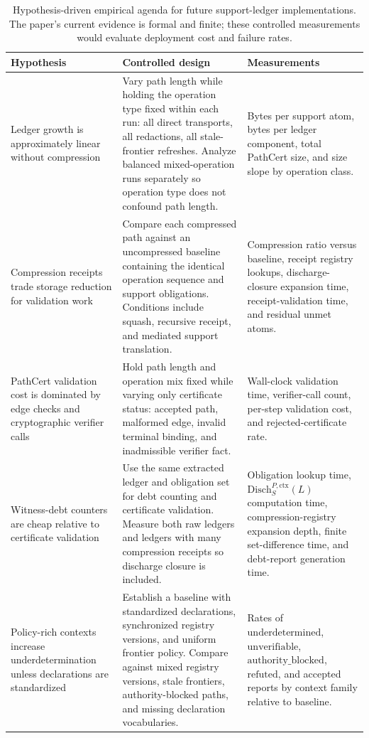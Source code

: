 \documentclass[11pt,twoside]{article}
\newcommand{\OGSchemaTableFont}{\footnotesize}
\newcommand{\OGTableHeaderRow}{\rowcolor{tableheaderbg}}
\newcommand{\TableHeaderRow}{\OGTableHeaderRow}
\newcommand{\OGAltRow}{\rowcolor{tablerowbg}}
\newenvironment{OGTable}[2][ht]{%
  \begin{table}[#1]
  \centering
  #2
  \renewcommand{\arraystretch}{1.08}%
  \rowcolors{2}{tablerowbg}{white}%
}{%
  \rowcolors{2}{}{}%
  \end{table}%
}
\theoremstyle{definition}
\newcommand{\Disch}{\mathrm{Disch}}
\newcommand{\ctx}{\mathrm{ctx}}
\newcommand{\refuted}{\mathrm{refuted}}
\newcommand{\underdetermined}{\mathrm{underdetermined}}
\newcommand{\authorityblocked}{\mathrm{authority\_blocked}}
\newcommand{\unverifiable}{\mathrm{unverifiable}}
\begin{document}
\begin{OGTable}{\OGSchemaTableFont}
\begin{tabularx}{\textwidth}{@{}>{\raggedright\arraybackslash}p{}>{\raggedright\arraybackslash}X>{\raggedright\arraybackslash}p{}@{}}
\toprule
\TableHeaderRow \textbf{Hypothesis} & \textbf{Controlled design} & \textbf{Measurements} \\
\midrule
Ledger growth is approximately linear without compression & Vary path length while holding the operation type fixed within each run: all direct transports, all redactions, all stale-frontier refreshes. Analyze balanced mixed-operation runs separately so operation type does not confound path length. & Bytes per support atom, bytes per ledger component, total PathCert size, and size slope by operation class. \\
\OGAltRow
Compression receipts trade storage reduction for validation work & Compare each compressed path against an uncompressed baseline containing the identical operation sequence and support obligations. Conditions include squash, recursive receipt, and mediated support translation. & Compression ratio versus baseline, receipt registry lookups, discharge-closure expansion time, receipt-validation time, and residual unmet atoms. \\
PathCert validation cost is dominated by edge checks and cryptographic verifier calls & Hold path length and operation mix fixed while varying only certificate status: accepted path, malformed edge, invalid terminal binding, and inadmissible verifier fact. & Wall-clock validation time, verifier-call count, per-step validation cost, and rejected-certificate rate. \\
\OGAltRow
Witness-debt counters are cheap relative to certificate validation & Use the same extracted ledger and obligation set for debt counting and certificate validation. Measure both raw ledgers and ledgers with many compression receipts so discharge closure is included. & Obligation lookup time, $\Disch_S^{P,\ctx}(L)$ computation time, compression-registry expansion depth, finite set-difference time, and debt-report generation time. \\
Policy-rich contexts increase underdetermination unless declarations are standardized & Establish a baseline with standardized declarations, synchronized registry versions, and uniform frontier policy. Compare against mixed registry versions, stale frontiers, authority-blocked paths, and missing declaration vocabularies. & Rates of $\underdetermined$, $\unverifiable$, $\authorityblocked$, $\refuted$, and accepted reports by context family relative to baseline. \\
\bottomrule
\end{tabularx}
\caption{Hypothesis-driven empirical agenda for future support-ledger implementations. The paper's current evidence is formal and finite; these controlled measurements would evaluate deployment cost and failure rates.}
\label{tab:measurement-agenda}
\end{OGTable}
\FloatBarrier
\end{document}

